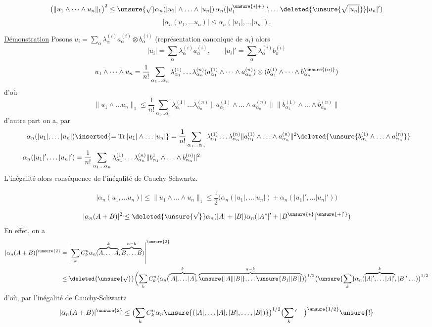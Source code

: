 \[
\bigl(\|u_1\wedge\cdots\wedge u_n\|_1\bigr)^2\leq
\unsure{\surd}\alpha_n(|u_1|\wedge\ldots\wedge|u_n|)
\,\alpha_n(|u_1^{\unsure{*|+}}|^{\prime}\!,\ldots\deleted{\unsure{\sqrt{\vphantom{u}|u_n|}}}|u_n|^{\prime})
\]
\[
|\alpha_n(u_1,\ldots u_n)|\leq\alpha_n(|u_1|,\ldots |u_n|).
\]

\uline{Démonstration} \quad Posons $u_i=\sum_\alpha\lambda_\alpha^{(i)}a_\alpha^{(i)}\otimes b_\alpha^{(i)}$
(représentation canonique de $u_i$) alors
\[
|u_i|=\sum_\alpha\lambda_\alpha^{(i)}a_\alpha^{(i)},\qquad
|u_i|'=\sum_\alpha\lambda_\alpha^{(i)}b_\alpha^{(i)}
\]
\[
u_1\wedge\cdots\wedge u_n=\frac{1}{n!}\sum_{\alpha_1\ldots\alpha_n}
\lambda_{\alpha_1}^{(1)}\ldots\lambda_{\alpha_n}^{(n)}
(a_{\alpha_1}^{(1)}\wedge\cdots\wedge a_{\alpha_n}^{(n)})
\otimes(b_{\alpha_1}^{(1)}\wedge\cdots\wedge b_{\alpha_n}^{\unsure{(n)}})
\]
d'où
\[
\|u_1\wedge\ldots u_n\|_1\leq\frac{1}{n!}\sum_{\alpha_1\ldots\alpha_n}
\lambda_{\alpha_1}^{(1)}\ldots\lambda_{\alpha_n}^{(n)}
\|a_{\alpha_1}^{(1)}\wedge\ldots\wedge a_{\alpha_n}^{(n)}\|
\|b_{\alpha_1}^{(1)}\wedge\ldots\wedge b_{\alpha_n}^{(n)}\|
\]
d'autre part on a, par 
\[
\begin{aligned}
\alpha_n(|u_1|,\ldots |u_n|)&\inserted{=\operatorname{Tr}|u_1|\wedge\ldots |u_n|}=
\frac{1}{n!}\sum_{\alpha_1\ldots\alpha_n}\lambda_{\alpha_1}^{(1)}\ldots\lambda_{\alpha_n}^{(n)}
\|a_{\alpha_1}^{(1)}\wedge\ldots\wedge a_{\alpha_n}^{(n)}\|^2
\deleted{\unsure{b_{\alpha_1}^{(1)}\wedge\ldots\wedge a_{\alpha_n}^{(n)}}}\\
\alpha_n(|u_1|',\ldots |u_n|')&=\frac{1}{n!}\sum_{\alpha_1\ldots\alpha_n}
\lambda_{\alpha_1}^{(1)}\ldots\lambda_{\alpha_n}^{(n)}
\|b_{\alpha_1}^{1}\wedge\ldots\wedge b_{\alpha_n}^{(n)}\|^2
\end{aligned}
\]
L'inégalité    alors conséquence de l'inégalité
de Cauchy-Schwartz.

\[
|\alpha_n(u_1,\ldots u_n)|\leq\|u_1\wedge\ldots\wedge u_n\|_1
\leq\frac{1}{2}\bigl(\alpha_n(|u_1|,\ldots |u_n|)+\alpha_n(|u_1|',\ldots |u_n|')\bigr)
\]

\[
|\alpha_n(A+B)|^2\leq\deleted{\unsure{\sqrt{\vphantom A}}}\alpha_n(|A|+|B|)
\alpha_n(|A^*|'+|B^{\unsure{*}}|^{\unsure{+|'}})
\]
En effet, on a 
\[
\begin{aligned}
|\alpha_n(A+B)|^{\unsure{2}}&=\left|\sum_k C_k^n\alpha_n(\overbrace{A,\ldots A}^{k},
\overbrace{B,\ldots B}^{n-k})\right|^{\unsure{2}}\\
&\leq\deleted{\unsure{\surd}}\biggl(\sum_k C_k^n
\bigl(\alpha_n(\overbrace{|A|,\ldots |A|}^{k},\overbrace{\unsure{|A||\lvert B\rvert},\ldots\unsure{B_1|\lvert B\rvert}}^{n-k})\bigr)^{1/2}
\bigl(\unsure{\sum_k}\alpha_n(\overbrace{|A|',\ldots |A|'}^{k},|B|'\ldots)\bigr)^{1/2}
\end{aligned}
\]
d'où, par l'inégalité de Cauchy-Schwartz
\[
|\alpha_n(A+B)|^{\unsure{2}}\leq\bigl(\sum_k C_k^n\alpha_n\unsure{(|A|,\ldots |A|,|B|,\ldots,|B|)}\bigr)^{1/2}
\bigl(\sum_k{}'\quad\bigr)^{\unsure{1/2}}\unsure{!}
\]
